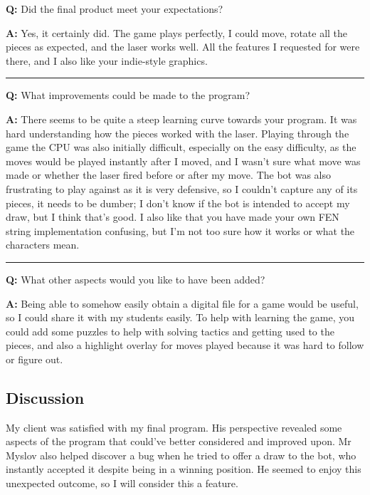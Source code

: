 \documentclass[../main/main.tex]{subfiles}
\begin{document}
\noindent\textbf{Q:} Did the final product meet your expectations?

\noindent\textbf{A:} Yes, it certainly did. The game plays perfectly, I could move, rotate all the pieces as expected, and the laser works well. All the features I requested for were there, and I also like your indie-style graphics.

\noindent\rule{\textwidth}{0.4pt}

\noindent\textbf{Q:} What improvements could be made to the program?

\noindent\textbf{A:} There seems to be quite a steep learning curve towards your program. It was hard understanding how the pieces worked with the laser. Playing through the game the CPU was also initially difficult, especially on the easy difficulty, as the moves would be played instantly after I moved, and I wasn't sure what move was made or whether the laser fired before or after my move. The bot was also frustrating to play against as it is very defensive, so I couldn't capture any of its pieces, it needs to be dumber; I don't know if the bot is intended to accept my draw, but I think that's good. I also like that you have made your own FEN string implementation confusing, but I'm not too sure how it works or what the characters mean.

\noindent\rule{\textwidth}{0.4pt}

\noindent\textbf{Q:} What other aspects would you like to have been added?

\noindent\textbf{A:} Being able to somehow easily obtain a digital file for a game would be useful, so I could share it with my students easily. To help with learning the game, you could add some puzzles to help with solving tactics and getting used to the pieces, and also a highlight overlay for moves played because it was hard to follow or figure out.

\subsection*{Discussion}
My client was satisfied with my final program. His perspective revealed some aspects of the program that could've better considered and improved upon. Mr Myslov also helped discover a bug when he tried to offer a draw to the bot, who instantly accepted it despite being in a winning position. He seemed to enjoy this unexpected outcome, so I will consider this a feature.
\end{document}
